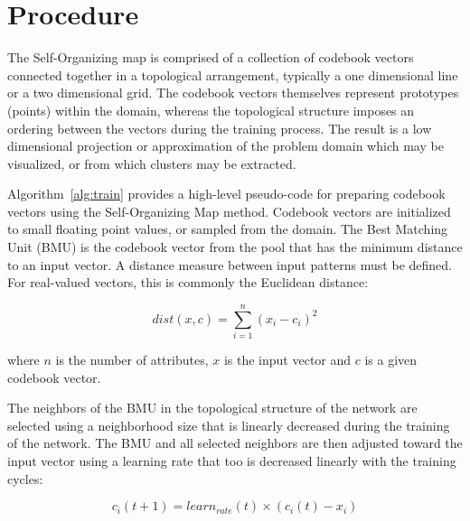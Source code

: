 \documentclass[a4paper, 11pt]{article}
\begin{document}
\section{Procedure}
\label{sec:procedure}
The Self-Organizing map is comprised of a collection of codebook vectors connected together in a topological arrangement, typically a one dimensional line or a two dimensional grid. The codebook vectors themselves represent prototypes (points) within the domain, whereas the topological structure imposes an ordering between the vectors during the training process. The result is a low dimensional projection or approximation of the problem domain which may be visualized, or from which clusters may be extracted.

Algorithm~\ref{alg:train} provides a high-level pseudo-code for preparing codebook vectors using the Self-Organizing Map method. 
Codebook vectors are initialized to small floating point values, or sampled from the domain. The Best Matching Unit (BMU) is the codebook vector from the pool that has the minimum distance to an input vector. A distance measure between input patterns must be defined. For real-valued vectors, this is commonly the Euclidean distance:

\begin{equation}
	dist(x,c) = \sum_{i=1}^{n} (x_i - c_i)^2
\end{equation}

where $n$ is the number of attributes, $x$ is the input vector and $c$ is a given codebook vector.

The neighbors of the BMU in the topological structure of the network are selected using a neighborhood size that is linearly decreased during the training of the network. The BMU and all selected neighbors are then adjusted toward the input vector using a learning rate that too is decreased linearly with the training cycles:

\begin{equation}
	c_i(t+1) = learn_{rate}(t) \times (c_i(t) - x_i)
\end{equation}
\end{document}
